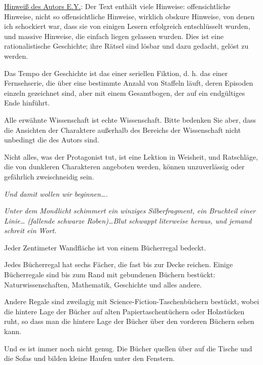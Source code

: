 

\hypertarget{ein-uxe4uuxdferst-unwahrscheinlicher-tag}{%

\uline{Hinweiß des Autors E.Y.}: Der Text enthält viele Hinweise: offensichtliche Hinweise, nicht so offensichtliche Hinweise, wirklich obskure Hinweise, von denen ich schockiert war, dass sie von einigen Lesern erfolgreich entschlüsselt wurden, und massive Hinweise, die einfach liegen gelassen wurden. Dies ist eine rationalistische Geschichte; ihre Rätsel sind lösbar und dazu gedacht, gelöst zu werden.

Das Tempo der Geschichte ist das einer seriellen Fiktion, d. h. das einer Fernsehserie, die über eine bestimmte Anzahl von Staffeln läuft, deren Episoden einzeln gezeichnet sind, aber mit einem Gesamtbogen, der auf ein endgültiges Ende hinführt.

Alle erwähnte Wissenschaft ist echte Wissenschaft. Bitte bedenken Sie aber, dass die Ansichten der Charaktere außerhalb des Bereichs der Wissenschaft nicht unbedingt die des Autors sind.

Nicht alles, was der Protagonist tut, ist eine Lektion in Weisheit, und Ratschläge, die von dunkleren Charakteren angeboten werden, können unzuverlässig oder gefährlich zweischneidig sein.

\emph{Und damit wollen wir beginnen….}

\emph{Unter dem Mondlicht schimmert ein winziges Silberfragment, ein Bruchteil einer Linie… (fallende schwarze Roben)…Blut schwappt literweise heraus, und jemand schreit ein Wort.}

Jeder Zentimeter Wandfläche ist von einem Bücherregal bedeckt.

Jedes Bücherregal hat sechs Fächer, die fast bis zur Decke reichen. Einige Bücherregale sind bis zum Rand mit gebundenen Büchern bestückt: Naturwissenschaften, Mathematik, Geschichte und alles andere.

Andere Regale sind zweilagig mit Science-Fiction-Taschenbüchern bestückt, wobei die hintere Lage der Bücher auf alten Papiertaschentüchern oder Holzstücken ruht, so dass man die hintere Lage der Bücher über den vorderen Büchern sehen kann.

Und es ist immer noch nicht genug. Die Bücher quellen über auf die Tische und die Sofas und bilden kleine Haufen unter den Fenstern.

}
